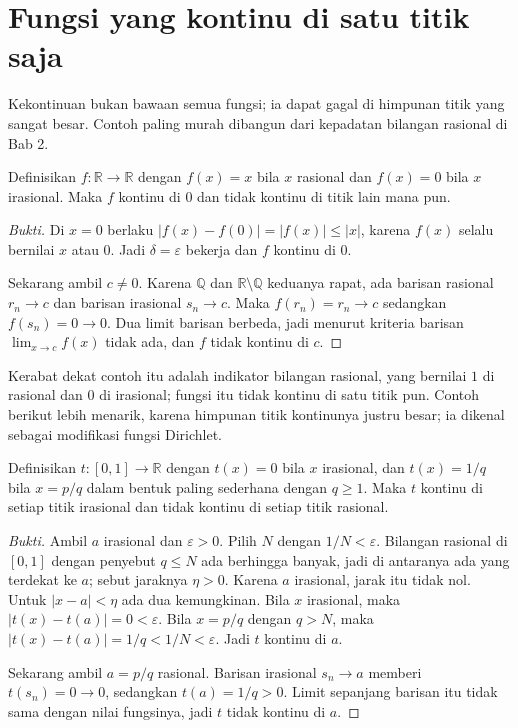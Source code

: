 \section{Fungsi yang kontinu di satu titik saja}

Kekontinuan bukan bawaan semua fungsi; ia dapat gagal di himpunan titik yang sangat
besar. Contoh paling murah dibangun dari kepadatan bilangan rasional di Bab 2.

\begin{contoh}
Definisikan $f\colon\mathbb{R}\to\mathbb{R}$ dengan $f(x)=x$ bila $x$ rasional dan
$f(x)=0$ bila $x$ irasional. Maka $f$ kontinu di $0$ dan tidak kontinu di titik lain
mana pun.
\end{contoh}

\begin{proof}[Bukti]
Di $x=0$ berlaku $|f(x)-f(0)|=|f(x)|\le|x|$, karena $f(x)$ selalu bernilai $x$ atau
$0$. Jadi $\delta=\varepsilon$ bekerja dan $f$ kontinu di $0$.

Sekarang ambil $c\neq 0$. Karena $\mathbb{Q}$ dan $\mathbb{R}\setminus\mathbb{Q}$
keduanya rapat, ada barisan rasional $r_{n}\to c$ dan barisan irasional $s_{n}\to c$.
Maka $f(r_{n})=r_{n}\to c$ sedangkan $f(s_{n})=0\to 0$. Dua limit barisan berbeda,
jadi menurut kriteria barisan $\lim_{x\to c}f(x)$ tidak ada, dan $f$ tidak kontinu di
$c$.
\end{proof}

Kerabat dekat contoh itu adalah indikator bilangan rasional, yang bernilai $1$ di
rasional dan $0$ di irasional; fungsi itu tidak kontinu di satu titik pun. Contoh
berikut lebih menarik, karena himpunan titik kontinunya justru besar; ia dikenal
sebagai modifikasi fungsi Dirichlet.

\begin{contoh}
Definisikan $t\colon[0,1]\to\mathbb{R}$ dengan $t(x)=0$ bila $x$ irasional, dan
$t(x)=1/q$ bila $x=p/q$ dalam bentuk paling sederhana dengan $q\ge 1$. Maka $t$
kontinu di setiap titik irasional dan tidak kontinu di setiap titik rasional.
\end{contoh}

\begin{proof}[Bukti]
Ambil $a$ irasional dan $\varepsilon>0$. Pilih $N$ dengan $1/N<\varepsilon$. Bilangan
rasional di $[0,1]$ dengan penyebut $q\le N$ ada berhingga banyak, jadi di antaranya
ada yang terdekat ke $a$; sebut jaraknya $\eta>0$. Karena $a$ irasional, jarak itu
tidak nol. Untuk $|x-a|<\eta$ ada dua kemungkinan. Bila $x$ irasional, maka
$|t(x)-t(a)|=0<\varepsilon$. Bila $x=p/q$ dengan $q>N$, maka
$|t(x)-t(a)|=1/q<1/N<\varepsilon$. Jadi $t$ kontinu di $a$.

Sekarang ambil $a=p/q$ rasional. Barisan irasional $s_{n}\to a$ memberi
$t(s_{n})=0\to 0$, sedangkan $t(a)=1/q>0$. Limit sepanjang barisan itu tidak sama
dengan nilai fungsinya, jadi $t$ tidak kontinu di $a$.
\end{proof}

